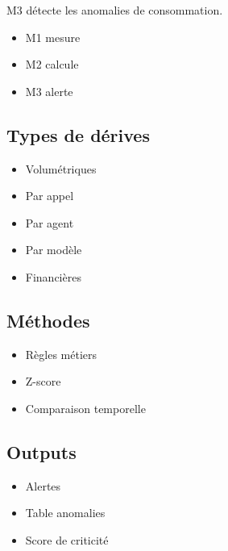 \documentclass[11pt,a4paper]{article}
\begin{document}
M3 détecte les anomalies de consommation.

\begin{itemize}
\item M1 mesure
\item M2 calcule
\item M3 alerte
\end{itemize}

\subsection{Types de dérives}

\begin{itemize}
\item Volumétriques
\item Par appel
\item Par agent
\item Par modèle
\item Financières
\end{itemize}

\subsection{Méthodes}

\begin{itemize}
\item Règles métiers
\item Z-score
\item Comparaison temporelle
\end{itemize}

\subsection{Outputs}

\begin{itemize}
\item Alertes
\item Table anomalies
\item Score de criticité
\end{itemize}
\end{document}

